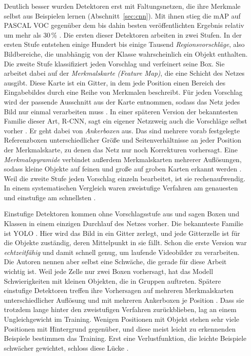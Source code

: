  Deutlich besser wurden Detektoren erst mit
Faltungsnetzen, die ihre Merkmale selbst aus Beispielen lernen
(Abschnitt~\ref{sec:cnn}). Mit ihnen stieg die mAP auf PASCAL VOC gegenüber dem
bis dahin besten veröffentlichten Ergebnis relativ um mehr als 30\,\%
\parencite{girshick2014}. Die ersten dieser Detektoren arbeiten in zwei Stufen.
In der ersten Stufe entstehen einige Hundert bis einige Tausend
\emph{Regionsvorschläge}, also Bildbereiche, die unabhängig von der Klasse
wahrscheinlich ein Objekt enthalten. Die zweite Stufe klassifiziert jeden
Vorschlag und verfeinert seine Box. Sie arbeitet dabei auf der
\emph{Merkmalskarte (Feature Map)}, die eine Schicht des Netzes ausgibt. Diese
Karte ist ein Gitter, in dem jede Position einen Bereich des
Eingabebildes durch eine Reihe von Merkmalen beschreibt. Für jeden Vorschlag
wird der passende Ausschnitt aus der Karte entnommen, sodass das Netz jedes
Bild nur einmal verarbeiten muss \parencite{girshick2015}. In einer späteren
Version der bekanntesten Familie dieser Art, R-CNN, sagt ein eigener Netzzweig
auch die Vorschläge selbst vorher \parencite{ren2015}. Er geht dabei von
\emph{Ankerboxen} aus. Das sind mehrere vorab festgelegte Referenzboxen
unterschiedlicher Größe und Seitenverhältnisse an jeder Position der
Merkmalskarte, zu denen das Netz nur noch Korrekturen vorhersagt. Eine
\emph{Merkmalspyramide} verbindet außerdem Merkmalskarten mehrerer
Auflösungen, sodass kleine Objekte auf feinen und große auf groben Karten
erkannt werden \parencite{lin2017fpn}. Weil die zweite Stufe jeden Vorschlag
einzeln bearbeitet, ist sie rechenaufwendig. In einem systematischen Vergleich
waren zweistufige Verfahren am genauesten und einstufige am schnellsten
\parencite{huang2017tradeoffs}.

 Einstufige Detektoren kommen ohne
Vorschlagsstufe aus und sagen Boxen und Klassen in einem einzigen Durchlauf des
Netzes vorher. Die bekannteste Familie ist YOLO \parencite{redmon2016}. Hier
wird das Bild in ein Gitter zerlegt, und jede Gitterzelle ist für die Objekte
zuständig, deren Mittelpunkt in sie fällt. Schon die erste Version war
\emph{echtzeitfähig} und damit schnell genug, um laufende Videobilder zu
verarbeiten. Die Autoren nennen aber selbst eine Schwäche, die gerade für diese
Arbeit wichtig ist. Weil jede Zelle nur zwei Boxen vorhersagt, hat das Modell
Schwierigkeiten mit kleinen Objekten, die in Gruppen auftreten. Spätere
einstufige Detektoren treffen ihre Vorhersagen auf mehreren Merkmalskarten
unterschiedlicher Auflösung und mit mehreren Ankerboxen je Position
\parencite{liu2016ssd,redmon2017yolo9000}. Dass sie trotzdem lange hinter den
zweistufigen Verfahren zurückblieben, lag an einem Ungleichgewicht im Training.
Wenigen Positionen mit Objekt stehen sehr viele Positionen mit Hintergrund
gegenüber, und diese meist leicht zu erkennenden Beispiele bestimmen das
Training. Erst eine Verlustfunktion, die leichte Beispiele schwächer gewichtet,
schloss diese Lücke \parencite{lin2017focal}.

